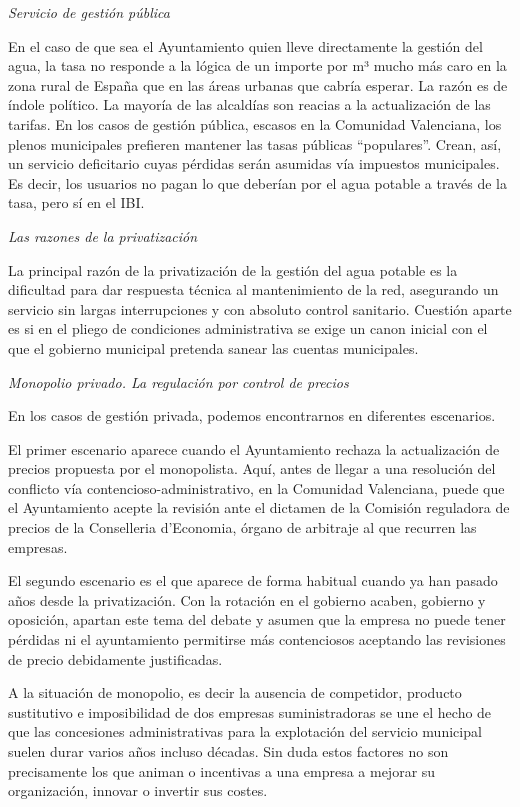 \documentclass[
]{article}
\begin{document}
\emph{Servicio de gestión pública}

En el caso de que sea el Ayuntamiento quien lleve directamente la
gestión del agua, la tasa no responde a la lógica de un importe por m³
mucho más caro en la zona rural de España que en las áreas urbanas que
cabría esperar. La razón es de índole político. La mayoría de las
alcaldías son reacias a la actualización de las tarifas. En los casos de
gestión pública, escasos en la Comunidad Valenciana, los plenos
municipales prefieren mantener las tasas públicas ``populares''. Crean,
así, un servicio deficitario cuyas pérdidas serán asumidas vía impuestos
municipales. Es decir, los usuarios no pagan lo que deberían por el agua
potable a través de la tasa, pero sí en el IBI.

\emph{Las razones de la privatización}

La principal razón de la privatización de la gestión del agua potable es
la dificultad para dar respuesta técnica al mantenimiento de la red,
asegurando un servicio sin largas interrupciones y con absoluto control
sanitario. Cuestión aparte es si en el pliego de condiciones
administrativa se exige un canon inicial con el que el gobierno
municipal pretenda sanear las cuentas municipales.

\emph{Monopolio privado. La regulación por control de precios}

En los casos de gestión privada, podemos encontrarnos en diferentes
escenarios.

El primer escenario aparece cuando el Ayuntamiento rechaza la
actualización de precios propuesta por el monopolista. Aquí, antes de
llegar a una resolución del conflicto vía contencioso-administrativo, en
la Comunidad Valenciana, puede que el Ayuntamiento acepte la revisión
ante el dictamen de la Comisión reguladora de precios de la Conselleria
d'Economia, órgano de arbitraje al que recurren las empresas.

El segundo escenario es el que aparece de forma habitual cuando ya han
pasado años desde la privatización. Con la rotación en el gobierno
acaben, gobierno y oposición, apartan este tema del debate y asumen que
la empresa no puede tener pérdidas ni el ayuntamiento permitirse más
contenciosos aceptando las revisiones de precio debidamente
justificadas.

A la situación de monopolio, es decir la ausencia de competidor,
producto sustitutivo e imposibilidad de dos empresas suministradoras se
une el hecho de que las concesiones administrativas para la explotación
del servicio municipal suelen durar varios años incluso décadas. Sin
duda estos factores no son precisamente los que animan o incentivas a
una empresa a mejorar su organización, innovar o invertir sus costes.
\end{document}
